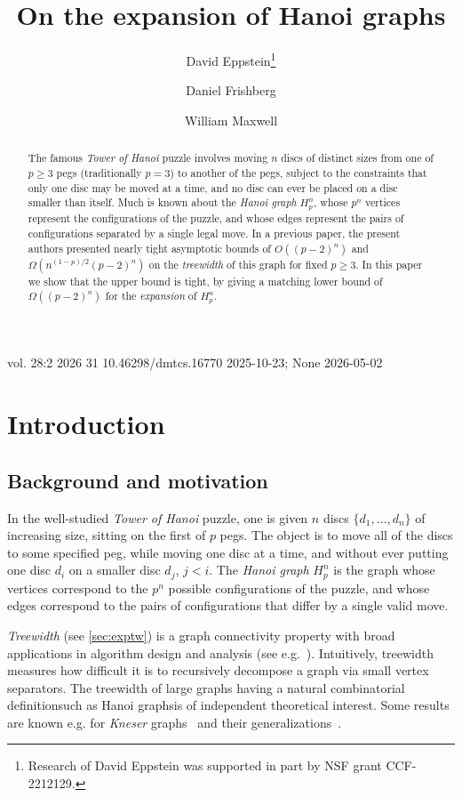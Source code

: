 \documentclass[
final
]{dmtcs-episciences}
\author[Eppstein et al.]{David Eppstein\affiliationmark{1}\thanks{Research of David Eppstein was supported in part by NSF grant CCF-2212129.}
  \and Daniel Frishberg\affiliationmark{2}
  \and William Maxwell\affiliationmark{3}}
\title{On the expansion of Hanoi graphs}
\affiliation{
  University of California, Irvine, CA, United States\\
  California Polytechnic State University, San Luis Obispo, CA, United States\\
  Oregon State University, Corvallis, OR, United States}
\begin{document}
\publicationdata
{vol. 28:2}
{2026}
{31}
{10.46298/dmtcs.16770}
{2025-10-23; None}
{2026-05-02}

\maketitle
\begin{abstract}
The famous \emph{Tower of Hanoi} puzzle involves moving $n$ discs of distinct sizes from one of $p\geq 3$ pegs (traditionally $p=3$) to another of the pegs, subject to the constraints that only one disc may be moved at a time, and no disc can ever be placed on a disc smaller than itself. Much is known about the \emph{Hanoi graph} $H_p^n$, whose $p^n$ vertices represent the configurations of the puzzle, and whose edges represent the pairs of configurations separated by a single legal move. In a previous paper, the present authors presented nearly tight asymptotic bounds of $O((p-2)^n)$ and $\Omega(n^{(1-p)/2}(p-2)^n)$ on the \emph{treewidth} of this graph for fixed $p \geq 3$. In this paper we show that the upper bound is tight, by giving a matching lower bound of $\Omega((p-2)^n)$ for the \emph{expansion} of $H_p^n$.
\end{abstract}

\section{Introduction}
\label{sec:intro}

\subsection{Background and motivation}
In the well-studied \emph{Tower of Hanoi} puzzle, one is given $n$ discs $\{d_1, \dots, d_n\}$ of increasing size, sitting on the first of $p$ pegs. The object is to move all of the discs to some specified peg, while moving one disc at a time, and without ever putting one disc $d_i$ on a smaller disc $d_j$, $j < i$. The \emph{Hanoi graph} $H_p^n$ is the graph whose vertices correspond to the $p^n$ possible configurations of the puzzle, and whose edges correspond to the pairs of configurations that differ by a single valid move.


\emph{Treewidth} (see \cref{sec:exptw}) is a graph connectivity property with broad applications in algorithm design and analysis (see e.g.~\cite{FPTsurvey}). Intuitively, treewidth measures how difficult it is to recursively decompose a graph via small vertex separators. The treewidth of large graphs having a natural combinatorial definition\textemdash such as Hanoi graphs\textemdash is of independent theoretical interest. Some results are known e.g. for \emph{Kneser} graphs~\citep{harveywood} and their generalizations~\citep{genkneser}.
\end{document}
